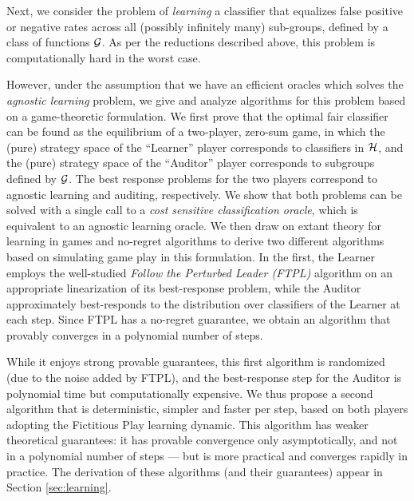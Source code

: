 Next, we consider the problem of \emph{learning} a classifier that equalizes false positive or negative
rates across all (possibly infinitely many) sub-groups, defined by a class of functions $\mathcal{G}$. As per the reductions
described above, this problem is computationally hard in the worst case.

However, under the assumption that we have an efficient oracles which solves the \emph{agnostic learning} problem,
we give and analyze algorithms for this problem based on a game-theoretic formulation.
We first prove that the optimal fair classifier can be found as the equilibrium of a two-player, zero-sum game,
in which the (pure) strategy space of the ``Learner'' player corresponds to classifiers in $\mathcal{H}$,
and the (pure) strategy space of the ``Auditor'' player corresponds to subgroups defined by $\mathcal{G}$.
The best response problems for the two players correspond to agnostic learning and auditing, respectively. We show that both problems can be solved with a single call to a \emph{cost sensitive classification oracle}, which is equivalent to an agnostic learning oracle.
We then draw on extant theory for learning in games and no-regret algorithms to derive two different algorithms based on simulating game play in this formulation.
In the first, the Learner employs the well-studied {\em Follow the Perturbed Leader (FTPL)\/} algorithm on an appropriate linearization of
its best-response problem, while the Auditor approximately best-responds to the distribution over classifiers of the Learner at each step.
Since FTPL has a no-regret guarantee, we obtain an algorithm that provably converges in a polynomial number of steps.  %

While it enjoys strong provable guarantees, this first algorithm is randomized (due to the noise added by FTPL), and the best-response step for the
Auditor is polynomial time but computationally expensive. We thus propose a second algorithm that is deterministic, simpler and faster per step, based on both players adopting the Fictitious Play learning dynamic. This algorithm has weaker theoretical guarantees: it has provable convergence only asymptotically, and not in a polynomial number of steps --- but is more practical and
converges rapidly in practice.
The derivation of these algorithms (and their guarantees) appear in Section \ref{sec:learning}. %



